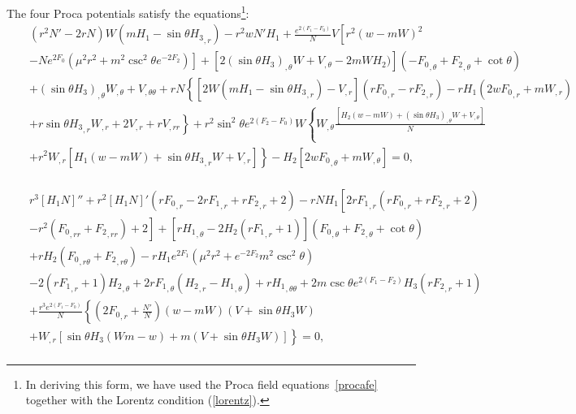 The four  Proca potentials satisfy the equations\footnote{In deriving this form, we have used
the Proca field equations~\eqref{procafe} together with the Lorentz condition (\ref{lorentz}).}:
\begin{eqnarray}
&&
( r^2 N'-2rN)  W( mH_1
- \sin \theta   {H_3}_{,r} )
-r^2 w N'  {H_1}+\frac{e^{2( {F_1}-F_0)}}{N} V \left[r^2 
(w-{m} W)^2
 \right. \nonumber \\
%
&&
\left.
-N e^{2 {F_0}} 
\left({\mu^2} r^2 +{m}^2 \csc 
^2\theta e^{-2F_2}\right)\right]
+[2 (\sin \theta {H_3})_{,\theta} W+V_{,\theta}-2mWH_2)] 
(-{F_0}_{,\theta}+{F_2}_{,\theta}+\cot\theta) 
 \nonumber \\
%
&&
+(\sin \theta  {H_3})_{,\theta} W_{,\theta}
+ V_{,\theta\theta}
+r N  \left\{
 [2 W(mH_1- \sin \theta   {H_3}_{,r})-V_{,r}] \left(r {F_0}_{,r}-r 
{F_2}_{,r}\right)
-rH_1 \left(2 w {F_0}_{,r}+{m} 
W_{,r}\right)
 \right. \nonumber \\
%
&&
\left.
+r \sin \theta {H_3}_{,r} W_{,r}+2 
V_{,r}+r V_{,rr}\right\}
+r^2 \sin ^2\theta e^{2 ({F_2}-F_0)}
W\left\{
 W_{,\theta} \frac{\left[{H_2} (w-{m} W)+(\sin \theta
{H_3})_{,\theta} W+V_{,\theta}\right]}{N}
 \right. \nonumber \\
%
&&
\left.
+r^2 W_{,r}[
H_1(w-{m}  W) 
+ \sin\theta  {H_3}_{,r} W
+ V_{,r} ]
\right\}
-{H_2} 
\left[
2 w {F_0}_{,\theta}+{m} W_{,\theta}\right] 
=0, \nonumber \\
&&
\end{eqnarray}


\begin{eqnarray}
&&  r^3 [{H_1} N]'' + r^2 [{H_1} N]'  \left(r {F_0}_{,r}-2 r {F_1}_{,r}+r 
{F_2}_{,r}+2\right)
-r N  {H_1} \left[2 r {F_1}_{,r} \left(r 
{F_0}_{,r}+r {F_2}_{,r}+2\right)
 \right. \nonumber \\
%
&&
\left.
-r^2( 
{F_0}_{,rr}+ {F_2}_{,rr})+2\right]
+[r {H_1}_{,\theta}-2 {H_2}\left(r {F_1}_{,r}+1\right)] ( {F_0}_{,\theta}+ {F_2}_{,\theta}+\cot\theta ) \nonumber \\
%
&&
+rH_2( {F_0}_{,r\theta}+
 {F_2}_{,r\theta})
 -r {H_1}e^{2 {F_1}} \left({\mu^2} r^2 +e^{-2F_2}{m}^2 \csc ^2\theta\right)
   \nonumber \\
%
&&
-2( r {F_1}_{,r}+1) {H_2}_{,\theta}
+2 r {F_1}_{,\theta} ({H_2}_{,r} -{H_1}_{,\theta})
+r  {H_1}_{,\theta\theta} 
+2 {m}  \csc\theta e^{2 
({F_1}-F_2)}{H_3} (r {F_2}_{,r}+1) 
%
 \nonumber \\
%
&&
+\frac{r^3  e^{2 
({F_1}-F_0)}}{N} \left\{
\left(2{F_0}_{,r}+\frac{N'}{N}\right)(w-mW)(V+\sin \theta {H_3} 
W )
 \right. \nonumber \\
%
&&
\left.
+W_{,r}[ \sin \theta {H_3}  
(W {m}-w)+m(V+\sin\theta H_3W)] 
\right\} =0, \nonumber \\
&&
\end{eqnarray}


